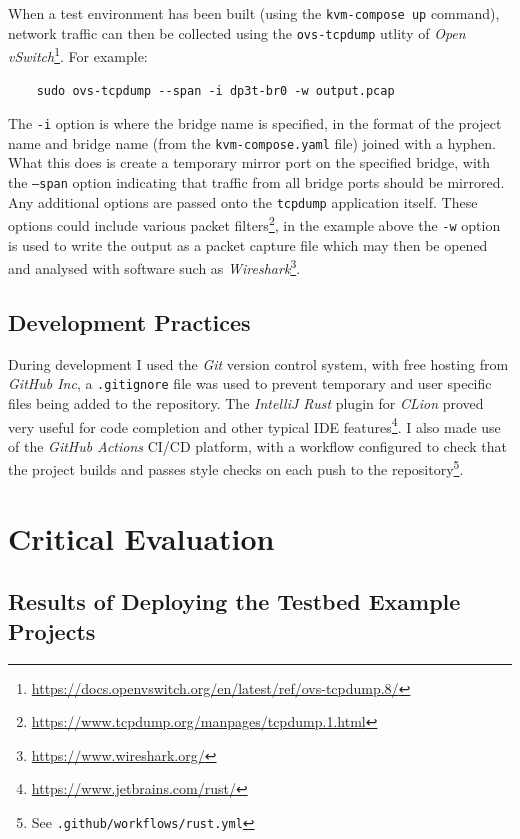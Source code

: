 \documentclass[
    author={Jacob Daniel Halsey},
    supervisor={Prof. Awais Rashid},
    degree={BSc},
    title={Building a Testbed for Evaluating Privacy Enhancing Technologies  (PETs)},
    subtitle={},
    type={software development},
    year={2021}
]{dissertation}
\begin{document}
When a test environment has been built (using the \texttt{kvm-compose up} command), network
traffic can then be collected using the \texttt{ovs-tcpdump} utlity of 
\emph{Open vSwitch}\footnote{\url{https://docs.openvswitch.org/en/latest/ref/ovs-tcpdump.8/}}.
For example:

\begin{verbatim}
	sudo ovs-tcpdump --span -i dp3t-br0 -w output.pcap
\end{verbatim}

The \texttt{-i} option is where the bridge name is specified, in the format of the project name
and bridge name (from the \texttt{kvm-compose.yaml} file) joined with a hyphen.
What this does is create a temporary mirror port on the specified bridge, with the \texttt{--span}
option indicating that traffic from all bridge ports should be mirrored. \\

Any additional options are passed onto the \texttt{tcpdump} application itself. 
These options could include various packet filters\footnote{\url{https://www.tcpdump.org/manpages/tcpdump.1.html}}, 
in the example above the \texttt{-w} option
is used to write the output as a packet capture file which may then be opened and analysed with software such as 
\emph{Wireshark}\footnote{\url{https://www.wireshark.org/}}.

\section{Development Practices}

During development I used the \emph{Git} version control system, with free hosting from \emph{GitHub Inc},
a \texttt{.gitignore} file was used to prevent temporary and user specific files being added to the
repository.
The \emph{IntelliJ Rust} plugin for \emph{CLion} proved very useful for code completion and other typical
IDE features\footnote{\url{https://www.jetbrains.com/rust/}}.
I also made use of the \emph{GitHub Actions} CI/CD platform, with a workflow configured to check that
the project builds and passes style checks on each push to the repository\footnote{See 
\texttt{.github/workflows/rust.yml}}. 

\chapter{Critical Evaluation}
\label{chap:evaluation}

\section{Results of Deploying the Testbed Example Projects}
\label{sect:results}
\end{document}
